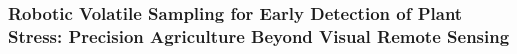 \subsubsection{Robotic Volatile Sampling for Early Detection of Plant Stress: Precision Agriculture Beyond Visual Remote Sensing \cite{Geckeler2023a}}

